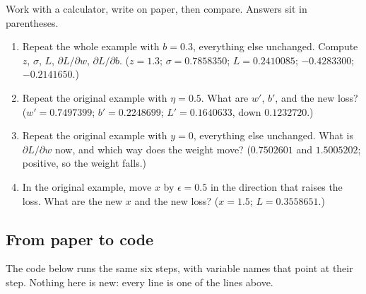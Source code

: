 Work with a calculator, write on paper, then compare. Answers sit in parentheses.

\begin{catatan}
\begin{enumerate}
  \item Repeat the whole example with $b = 0.3$, everything else unchanged. Compute $z$,
        $\sigma$, $L$, $\partial L/\partial w$, $\partial L/\partial b$.
        ($z = 1.3$; $\sigma = 0.7858350$; $L = 0.2410085$; $-0.4283300$; $-0.2141650$.)
  \item Repeat the original example with $\eta = 0.5$. What are $w'$, $b'$, and the new
        loss? ($w' = 0.7497399$; $b' = 0.2248699$; $L' = 0.1640633$, down $0.1232720$.)
  \item Repeat the original example with $y = 0$, everything else unchanged. What is
        $\partial L/\partial w$ now, and which way does the weight move?
        ($0.7502601$ and $1.5005202$; positive, so the weight falls.)
  \item In the original example, move $x$ by $\epsilon = 0.5$ in the direction that raises
        the loss. What are the new $x$ and the new loss? ($x = 1.5$; $L = 0.3558651$.)
\end{enumerate}
\end{catatan}

\subsection{From paper to code}

The code below runs the same six steps, with variable names that point at their step.
Nothing here is new: every line is one of the lines above.

